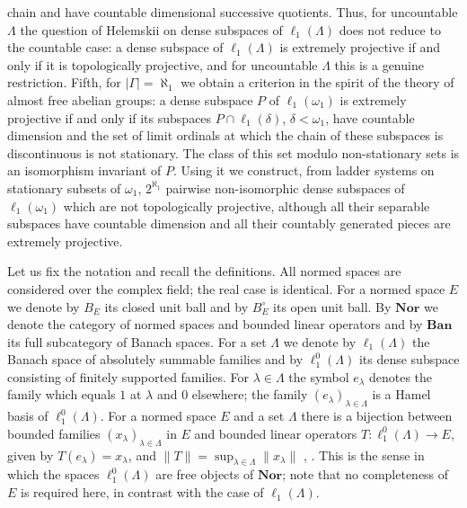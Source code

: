 \documentclass[12pt]{article}
\newcommand{\Nor}{\mathbf{Nor}}
\newcommand{\Ban}{\mathbf{Ban}}
\newcommand{\lo}[1]{\ell_1^0(#1)}
\newcommand{\ellone}[1]{\ell_1(#1)}
\newcommand{\norm}[1]{\lVert #1\rVert}
\begin{document}
chain and have countable dimensional successive quotients. Thus, for
uncountable $\Lambda$ the question of Helemskii on dense subspaces of
$\ellone{\Lambda}$ does not reduce to the countable case: a dense subspace of
$\ellone{\Lambda}$ is extremely projective if and only if it is topologically
projective, and for uncountable $\Lambda$ this is a genuine restriction.
Fifth, for $|\Gamma|=\aleph_1$ we obtain a criterion in the spirit of the
theory of almost free abelian groups: a dense subspace $P$ of
$\ellone{\omega_1}$ is extremely projective if and only if its subspaces
$P\cap\ellone{\delta}$, $\delta<\omega_1$, have countable dimension and the
set of limit ordinals at which the chain of these subspaces is discontinuous
is not stationary. The class of this set modulo non-stationary sets is an
isomorphism invariant of $P$. Using it we construct, from ladder systems on
stationary subsets of $\omega_1$, $2^{\aleph_1}$ pairwise non-isomorphic
dense subspaces of $\ellone{\omega_1}$ which are not topologically
projective, although all their separable subspaces have countable dimension
and all their countably generated pieces are extremely projective.

Let us fix the notation and recall the definitions. All normed spaces are
considered over the complex field; the real case is identical. For a normed
space $E$ we denote by $B_E$ its closed unit ball and by $B_E^\circ$ its open
unit ball. By $\Nor$ we denote the category of normed spaces and bounded linear
operators and by $\Ban$ its full subcategory of Banach spaces. For a set
$\Lambda$ we denote by $\ellone{\Lambda}$ the Banach space of absolutely
summable families and by $\lo{\Lambda}$ its dense subspace consisting of finitely
supported families. For $\lambda\in\Lambda$ the symbol $e_\lambda$ denotes the
family which equals $1$ at $\lambda$ and $0$ elsewhere; the family
${(e_\lambda)}_{\lambda\in\Lambda}$ is a Hamel basis of $\lo{\Lambda}$. For a
normed space $E$ and a set $\Lambda$ there is a bijection between bounded
families ${(x_\lambda)}_{\lambda\in\Lambda}$ in $E$ and bounded linear
operators $T:\lo{\Lambda}\to E$, given by $T(e_\lambda)=x_\lambda$, and
$\norm{T}=\sup_{\lambda\in\Lambda}\norm{x_\lambda}$
\cite[proposition 2.1]{HelExtrProjSeqAlg}, \cite[proposition 1.10]{GronLiftProbNormSp}.
This is the sense in which the spaces $\lo{\Lambda}$ are free objects of
$\Nor$; note that no completeness of $E$ is required here, in contrast with
the case of $\ellone{\Lambda}$.
\end{document}
